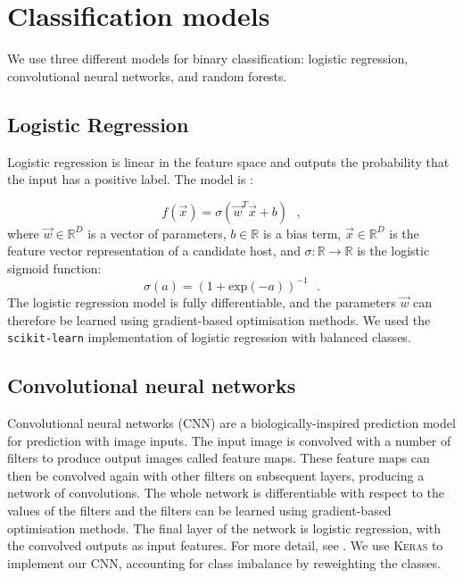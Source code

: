 \appendix

\section{Classification models}\label{app:models}

  We use three different models for binary classification: logistic
  regression, convolutional neural networks, and random forests.

  \subsection{Logistic Regression}
  \label{sec:logistic-regression}
    Logistic regression is linear in the feature space and outputs the
    probability that the input has a positive label. The model is
    \citep{bishop06ml}:

    \begin{equation}
        f(\vec x) = \sigma(\vec w^T \vec x + b) \,\,\,\,,
    \end{equation}
    where $\vec w \in \mathbb{R}^D$ is a vector of parameters, $b \in \mathbb{R}$ is a bias term, $\vec x \in \mathbb{R}^D$ is the feature vector representation of a candidate host, and $\sigma : \mathbb{R} \to \mathbb{R}$ is the logistic sigmoid function: \begin{equation}
        \sigma(a) = (1 + \mathrm{exp}(-a))^{-1}\,\,\,\,.
    \end{equation}%
    The logistic regression model is fully differentiable, and the parameters
    $\vec w$ can therefore be learned using gradient-based optimisation
    methods. {We used the \texttt{scikit-learn} \citep{pedregosa11sklearn}
    implementation of logistic regression with balanced classes}.

  \subsection{Convolutional neural networks}
  \label{sec:convolutional-neural-networks}

    Convolutional neural networks (CNN) are a biologically-inspired prediction
    model for prediction with image inputs. The input image is convolved with
    a number of filters to produce output images called feature maps. These
    feature maps can then be convolved again with other filters on subsequent
    layers, producing a network of convolutions. The whole network is
    differentiable with respect to the values of the filters and the filters
    can be learned using gradient-based optimisation methods. The final layer
    of the network is logistic regression, with the convolved outputs as input
    features. For more detail, see \citet[subsection II.A][]{lecun98}. We use
    \textsc{Keras} \citep{chollet15keras} to implement our CNN, accounting for
    class imbalance by reweighting the classes.

